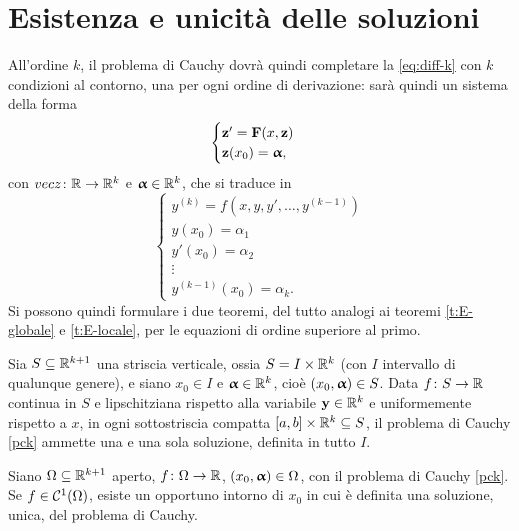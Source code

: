 \section{Esistenza e unicità delle soluzioni}
All'ordine $k$, il problema di Cauchy dovrà quindi completare la \eqref{eq:diff-k} con $k$ condizioni al contorno, una per ogni ordine di derivazione: sarà quindi un sistema della forma
\begin{equation}
\begin{cases}
\mathbf{z}'=\mathbf{F}(x,\mathbf{z})\\\mathbf{z}(x_0)=\bm{\upalpha},
\end{cases}
\end{equation}
con $vec z\colon\mathbb{R}\to\mathbb{R}^k$ e $\bm{\upalpha}\in\mathbb{R}^k$, che si traduce in
\begin{equation} \label{pck}
\begin{cases}
y^{(k)}=f(x,y,y',\dots,y^{(k-1)})\\
y(x_0)=\alpha_1\\
y'(x_0)=\alpha_2\\
\vdots\\
y^{(k-1)}(x_0)=\alpha_k.
\end{cases}
\end{equation}
Si possono quindi formulare i due teoremi, del tutto analogi ai teoremi \ref{t:E-globale} e \ref{t:E-locale}, per le equazioni di ordine superiore al primo.

\begin{teorema}
Sia $S\subseteq\mathbb{R}^{k+1}$ una striscia verticale, ossia $S=I\times\mathbb{R}^k$ (con $I$ intervallo di qualunque genere), e siano $x_0\in I$ e $\bm{\upalpha}\in\mathbb{R}^k$, cioè $(x_0,\bm{\upalpha})\in S$. Data $f\colon S\to\mathbb{R}$ continua in $S$ e lipschitziana rispetto alla variabile $\mathbf{y}\in\mathbb{R}^k$ e uniformemente rispetto a $x$, in ogni sottostriscia compatta $[a,b]\times\mathbb{R}^k\subseteq S$, il problema di Cauchy \eqref{pck} ammette una e una sola soluzione, definita in tutto $I$.
\end{teorema}
\begin{teorema}
Siano $\Omega\subseteq\mathbb{R}^{k+1}$ aperto, $f\colon\Omega\to\mathbb{R}$, $(x_0,\bm{\upalpha})\in\Omega$, con il problema di Cauchy \eqref{pck}. Se $f\in\mathcal{C}^{{1}}(\Omega)$, esiste un opportuno intorno di $x_0$ in cui è definita una soluzione, unica, del problema di Cauchy.
\end{teorema}

